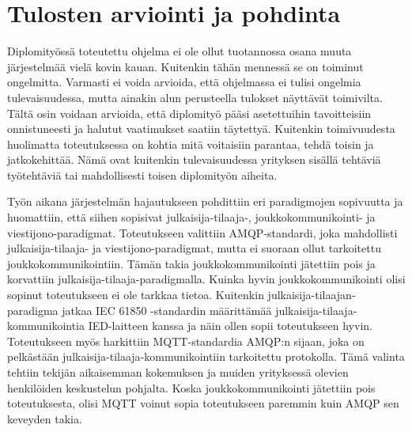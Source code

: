 \chapter{Tulosten arviointi ja pohdinta}
\label{ch:arviointi}
Diplomityössä toteutettu ohjelma ei ole ollut tuotannossa osana muuta järjestelmää vielä kovin kauan. Kuitenkin tähän mennessä se on toiminut ongelmitta. Varmasti ei voida arvioida, että ohjelmassa ei tulisi ongelmia tulevaisuudessa, mutta ainakin alun perusteella tulokset näyttävät toimivilta. Tältä osin voidaan arvioida, että diplomityö pääsi asetettuihin tavoitteisiin onnistuneesti ja halutut vaatimukset saatiin täytettyä. Kuitenkin toimivuudesta huolimatta toteutuksessa on kohtia mitä voitaisiin parantaa, tehdä toisin ja jatkokehittää. Nämä ovat kuitenkin tulevaisuudessa yrityksen sisällä tehtäviä työtehtäviä tai mahdollisesti toisen diplomityön aiheita.

Työn aikana järjestelmän hajautukseen pohdittiin eri paradigmojen sopivuutta ja huomattiin, että siihen sopisivat julkaisija-tilaaja-, joukkokommunikointi- ja viestijono-pa\-ra\-dig\-mat. Toteutukseen valittiin AMQP-standardi, joka mahdollisti julkaisija-tilaaja- ja viestijono-pa\-ra\-dig\-mat, mutta ei suoraan ollut tarkoitettu joukkokommunikointiin. Tämän takia joukkokommunikointi jätettiin pois ja korvattiin julkaisija-tilaaja-paradigmalla. Kuinka hyvin joukkokommunikointi olisi sopinut toteutukseen ei ole tarkkaa tietoa. Kuitenkin julkaisija-tilaajan-paradigma jatkaa IEC 61850 -standardin määrittämää julkaisija-tilaaja-kom\-mu\-ni\-koin\-ti\-a IED-laitteen kanssa ja näin ollen sopii toteutukseen hyvin. Toteutukseen myös harkittiin MQTT-standardia AMQP:n sijaan, joka on pelkästään julkaisija-tilaaja-kom\-mu\-ni\-koin\-tiin tarkoitettu protokolla. Tämä valinta tehtiin tekijän aikaisemman kokemuksen ja muiden yrityksessä olevien henkilöiden keskustelun pohjalta. Koska joukkokommunikointi jätettiin pois toteutuksesta, olisi MQTT voinut sopia toteutukseen paremmin kuin AMQP sen keveyden takia.

